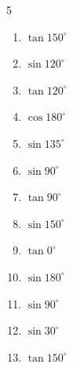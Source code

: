 \begin{multicols}{5}
\begin{enumerate}

  \item $\displaystyle \tan{150^\circ}$


  \item $\displaystyle \sin{120^\circ}$


  \item $\displaystyle \tan{120^\circ}$


  \item $\displaystyle \cos{180^\circ}$

        \phantom{$\displaystyle =-1$}

  \item $\displaystyle \sin{135^\circ}$


  \item $\displaystyle \sin{90^\circ}$

        \phantom{$\displaystyle =1$}

  \item $\displaystyle \tan{90^\circ}$

        \phantom{$\displaystyle なし$}

  \item $\displaystyle \sin{150^\circ}$


  \item $\displaystyle \tan{0^\circ}$

        \phantom{$\displaystyle =0$}

  \item $\displaystyle \sin{180^\circ}$

        \phantom{$\displaystyle =0$}

  \item $\displaystyle \sin{90^\circ}$

        \phantom{$\displaystyle =1$}

  \item $\displaystyle \sin{30^\circ}$


  \item $\displaystyle \tan{150^\circ}$


\end{enumerate}
\end{multicols}
